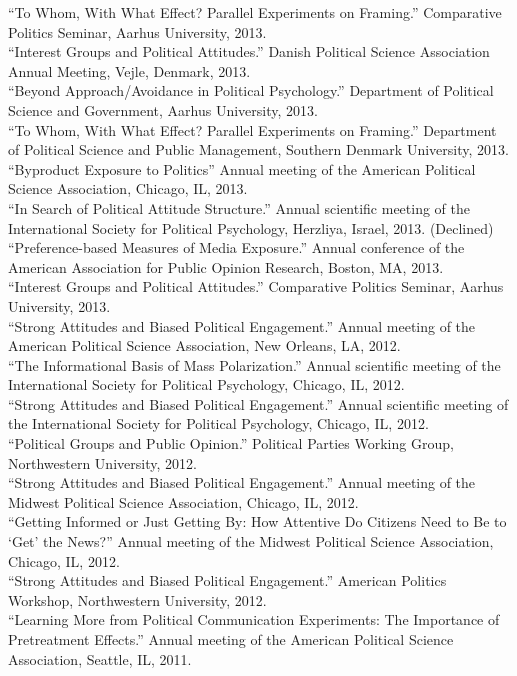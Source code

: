 \documentclass[12pt]{article}
\renewcommand{\section}[1]{\pagebreak[3]%
    \llap{\scshape\smash{\parbox[t]{\marginparwidth}{\raggedright {\color{lg}#1}}}}%
    \vspace{-\baselineskip}\par}
\newcommand{\entry}[1]{\indent {\color{lg}\guillemotright}\hspace{2pt}#1\vspace{.25em}\\}
\begin{document}
\section{Conference\\Papers\\and\\Invited\\Presentations}
\entry{``To Whom, With What Effect? Parallel Experiments on Framing.'' Comparative Politics Seminar, Aarhus University, 2013.}
\entry{``Interest Groups and Political Attitudes.'' Danish Political Science Association Annual Meeting, Vejle, Denmark, 2013.}
\entry{``Beyond Approach/Avoidance in Political Psychology.'' Department of Political Science and Government, Aarhus University, 2013.}
\entry{``To Whom, With What Effect? Parallel Experiments on Framing.'' Department of Political Science and Public Management, Southern Denmark University, 2013.}
\entry{``Byproduct Exposure to Politics'' Annual meeting of the American Political Science Association, Chicago, IL, 2013.}
\entry{``In Search of Political Attitude Structure.'' Annual scientific meeting of the International Society for Political Psychology, Herzliya, Israel, 2013. (Declined)}
\entry{``Preference-based Measures of Media Exposure.'' Annual conference of the American Association for Public Opinion Research, Boston, MA, 2013.}
\entry{``Interest Groups and Political Attitudes.'' Comparative Politics Seminar, Aarhus University, 2013.}
\entry{``Strong Attitudes and Biased Political Engagement.'' Annual meeting of the American Political Science Association, New Orleans, LA, 2012.}
\entry{``The Informational Basis of Mass Polarization.'' Annual scientific meeting of the International Society for Political Psychology, Chicago, IL, 2012.}
\entry{``Strong Attitudes and Biased Political Engagement.'' Annual scientific meeting of the International Society for Political Psychology, Chicago, IL, 2012.}
\entry{``Political Groups and Public Opinion.'' Political Parties Working Group, Northwestern University, 2012.}
\entry{``Strong Attitudes and Biased Political Engagement.'' Annual meeting of the Midwest Political Science Association, Chicago, IL, 2012.}
\entry{``Getting Informed or Just Getting By: How Attentive Do Citizens Need to Be to `Get' the News?'' Annual meeting of the Midwest Political Science Association, Chicago, IL, 2012.}
\entry{``Strong Attitudes and Biased Political Engagement.'' American Politics Workshop, Northwestern University, 2012.}
\entry{``Learning More from Political Communication Experiments: The Importance of Pretreatment Effects.'' Annual meeting of the American Political Science Association, Seattle, IL, 2011.}
\end{document}
